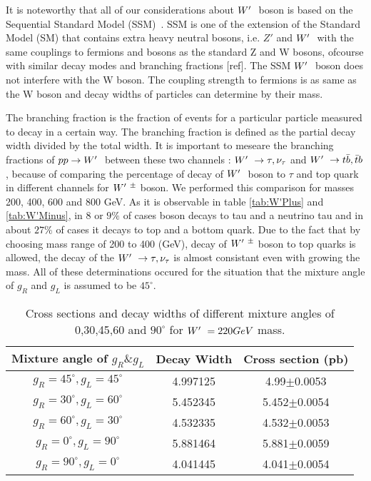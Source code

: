 It is noteworthy that all of our considerations about $ W^\prime~ $ boson is based on the Sequential Standard Model (SSM)~\cite{Khachatryan:2014tva}. SSM is one of the extension of the Standard Model (SM) that contains extra heavy neutral bosons, i.e. $ Z' $ and $ W^\prime~ $ with the same couplings to fermions and bosons as the standard Z and W bosons, ofcourse with similar decay modes and branching fractions [ref]. The SSM $ W^\prime~ $ boson does not interfere with the W boson. The coupling strength to fermions is as same as the W boson and decay widths of particles can determine by their mass. 

The branching fraction is the fraction of events for a particular particle measured to decay in a certain way. The branching fraction is defined as the partial decay width divided by the total width. It is important to meseare the branching fractions of $ pp\rightarrow W^\prime~$ between these two channels : $ W^\prime~\rightarrow \tau,\nu_\tau $ and $ W^\prime~\rightarrow  t \bar{b},\bar{t}b $, because of comparing the percentage of decay of $ W^\prime~ $ boson to $ \tau $ and top quark in different channels for $ W^\prime~^\pm $ boson. We performed this comparison for masses 200, 400, 600 and 800 GeV. As it is observable in table \ref{tab:W'Plus} and \ref{tab:W'Minus}, in 8 or $9\%$ of cases \wprime boson decays to tau and a neutrino tau and in about $27\%$ of cases it decays to top and a bottom quark. Due to the fact that by choosing mass range of 200 to 400 (GeV), decay of $ W^\prime~^\pm $ boson to top quarks is allowed, the decay of the $ W^\prime~\rightarrow \tau,\nu_\tau $ is almost consistant even with growing the mass. All of these determinations occured for the situation that the mixture angle of $ g_R$ and  $g_L$ is assumed to be $45^\circ $. 
 



\begin{table}[htb]
	\centering
\begin{tabular}{|c|c|c|}
\hline 
Mixture angle of $ g_R \& g_L $  &  Decay Width  &  Cross section (pb)\\
\hline 
$g_R=45^\circ,g_L=45^\circ$& 4.997125& 4.99$\pm$0.0053\\
$g_R=30^\circ,g_L=60^\circ$ &5.452345& 5.452$\pm$0.0054\\
$g_R=60^\circ,g_L=30^\circ$& 4.532335& 4.532$\pm$0.0053 \\
$g_R=0^\circ,g_L=90^\circ$&5.881464& 5.881$\pm$0.0059\\
$g_R=90^\circ,g_L=0^\circ$& 4.041445& 4.041$\pm$0.0054\\


\hline
\end{tabular}
\caption{Cross sections and decay widths of different mixture angles of 0,30,45,60 and $90^\circ$ for $W^\prime~ =220 GeV$ mass. \label{tab:220 GeV} }
\end{table}


